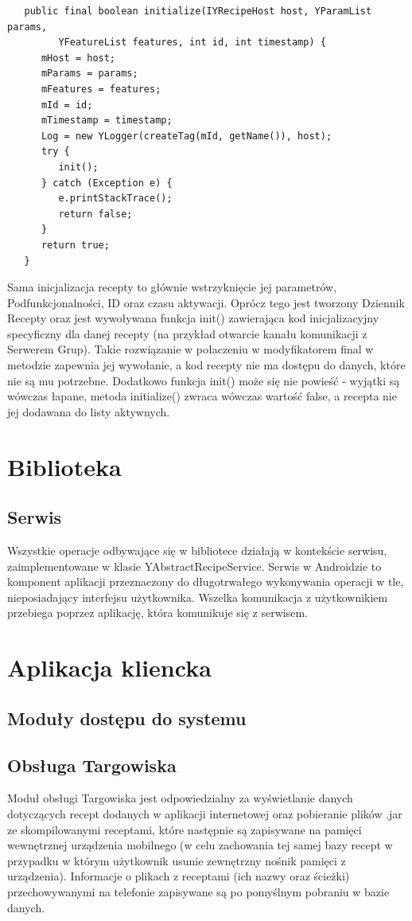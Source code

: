 \documentclass[11pt,a4paper,polish,thesis]{dcsbook}
\begin{document}
\begin{verbatim}
   public final boolean initialize(IYRecipeHost host, YParamList params,
         YFeatureList features, int id, int timestamp) {
      mHost = host;
      mParams = params;
      mFeatures = features;
      mId = id;
      mTimestamp = timestamp;
      Log = new YLogger(createTag(mId, getName()), host);
      try {
         init();
      } catch (Exception e) {
         e.printStackTrace();
         return false;
      }
      return true;
   }
\end{verbatim}

Sama inicjalizacja recepty to głównie wstrzyknięcie jej parametrów, Podfunkcjonalności, ID oraz czasu aktywacji. Oprócz tego jest tworzony Dziennik Recepty oraz jest wywoływana funkcja init() zawierająca kod inicjalizacyjny specyficzny dla danej recepty (na przykład otwarcie kanału komunikacji z Serwerem Grup). Takie rozwiązanie w połaczeniu w modyfikatorem final w metodzie zapewnia jej wywołanie, a kod recepty nie ma dostępu do danych, które nie są mu potrzebne. Dodatkowo funkcja init() może się nie powieść - wyjątki są wówczas łapane, metoda initialize() zwraca wówczas wartość false, a recepta nie jej dodawana do listy aktywnych.



\section{Biblioteka}
\subsection{Serwis}
Wszystkie operacje odbywające się w bibliotece działają w kontekście serwisu, zaimplementowane w klasie YAbstractRecipeService.
Serwis w Androidzie to komponent aplikacji przeznaczony do długotrwałego wykonywania operacji w tle, nieposiadający interfejsu użytkownika. \cite{android.serwis}
Wszelka komunikacja z użytkownikiem przebiega poprzez aplikację, która komunikuje się z serwisem.

\section{Aplikacja kliencka}
\subsection{Moduły dostępu do systemu}
\subsection {Obsługa Targowiska}
Moduł obsługi Targowiska jest odpowiedzialny za  wyświetlanie danych dotyczących recept dodanych w aplikacji internetowej oraz pobieranie plików .jar ze skompilowanymi receptami, które następnie są zapisywane na pamięci wewnętrznej urządzenia mobilnego (w celu zachowania tej samej bazy recept w przypadku w którym użytkownik usunie zewnętrzny nośnik pamięci z urządzenia). Informacje o plikach z receptami (ich nazwy oraz ścieżki) przechowywanymi na telefonie zapisywane są po pomyślnym pobraniu w  bazie danych.
\end{document}
